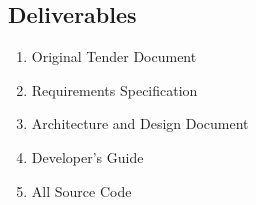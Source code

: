 \subsection{Deliverables}
\small
\begin{enumerate}
\item Original Tender Document
\item Requirements Specification
\item Architecture and Design Document
\item Developer's Guide
\item All Source Code
\end{enumerate}
